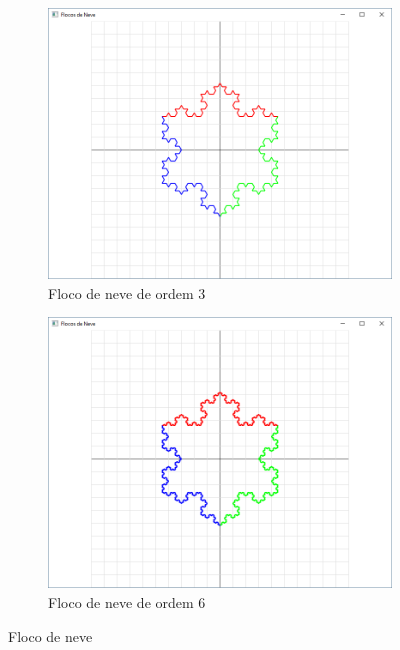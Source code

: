 \begin{enumerate}
\begin{enumerate}
\begin{figure}[!htp]
\begin{subfigure}[b]{0.4\textwidth}
              \centerline{\includegraphics[width=.9\textwidth]{img/cap4_ex15c}}
              \caption{Floco de neve de ordem $3$}
              \label{fig:cap04_ex15c}
          \end{subfigure}
          \hfill
          \begin{subfigure}[b]{0.4\textwidth}
              \centerline{\includegraphics[width=.9\textwidth]{img/cap4_ex15d}}
              \caption{Floco de neve de ordem $6$}
              \label{fig:cap04_ex15d}
          \end{subfigure}

          \caption{
            \label{fig:flocos}%
            Floco de neve
          }

        \end{figure}
    \end{enumerate}


\end{enumerate}
